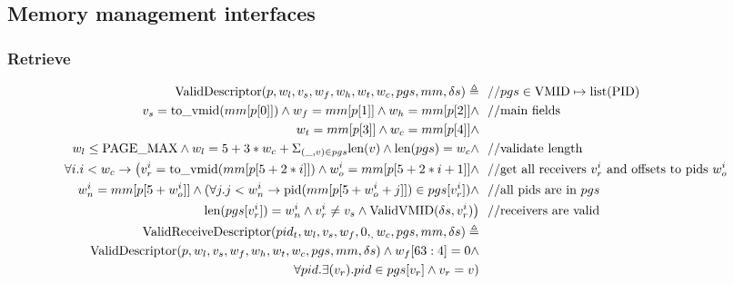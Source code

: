 \documentclass[a4paper]{article}
\let\Oldsubsection\subsection
\renewcommand{\subsection}{\FloatBarrier\Oldsubsection}
\let\Oldsubsubsection\subsubsection
\renewcommand{\subsubsection}{\FloatBarrier\Oldsubsubsection}
\newcommand*{\defined}{\triangleq}
\newcommand*{\PID}{\text{PID}}
\newcommand*{\VMID}{\text{VMID}}
\newcommand*{\PPMAX}{\text{PAGE\_MAX}}
\newcommand*{\EI}[1]{\mathtt{ExecInstr} \; {#1}}
\newcommand{\FALSE}{\mathtt{False}}
\begin{document}
\begin{figure}[hbt!]
\end{figure}

\clearpage

\subsection{Memory management interfaces}

\subsubsection{Retrieve}

\begin{align*}
  \text{ValidDescriptor}(p,w_l,v_s,w_f,w_h,w_t,w_c,pgs,mm,\delta s)\defined &~~//pgs \in \VMID \mapsto \text{list}(\PID)\\
  v_{s}=\tv{mm[p[0]]} \land w_{f}=mm[p[1]] \land w_{h}=mm[p[2]] \land &~~//\text{main fields}\\
   w_{t} = mm[p[3]] \land w_{c} = mm[p[4]] \land &~~ \\
  w_l \le \PPMAX \land w_{l} = 5+3*w_{c} + \Sigma_{(\_,v)\in pgs} \text{len}(v) \land \text{len}(pgs)=w_{c} \land &~~//\text{validate length} \\
  \forall i. i < w_{c}\rightarrow \big(v_{r}^{i}=\tv{mm[p[5+2*i]]} \land w_{o}^{i} = mm[p[5+2*i+1]] \land &~~//\text{get all receivers $v_{r}^{i}$ and offsets to pids $w_{o}^{i}$ }\\
  w_{n}^{i}=mm[p[5+w_{o}^{i}]] \land (\forall j. j < w_{n}^{i}\rightarrow \text{pid}(mm[p[5+w_{o}^{i}+j]])\in pgs[v_{r}^{i}]) \land&~~//\text{all pids are in $pgs$}\\
  \text{len}(pgs[v_{r}^{i}])=w_{n}^{i}\land v_{r}^{i}\ne v_{s} \land \text{ValidVMID}(\delta s,v_{r}^{i})\big) &~~//\text{receivers are valid}
  \\
  \text{ValidReceiveDescriptor}(pid_t,w_l,v_{s},w_f,0,_,w_c,pgs,mm,\delta s) \defined & \\
  \text{ValidDescriptor}(p,w_l,v_s,w_f,w_h,w_t,w_c,pgs,mm,\delta s) \land w_f[63:4] = 0 \land& \\
   \forall pid. \exists (v_{r}). pid \in pgs[v_{r}] \land v_{r} = v)
  \end{align*}
\end{document}
